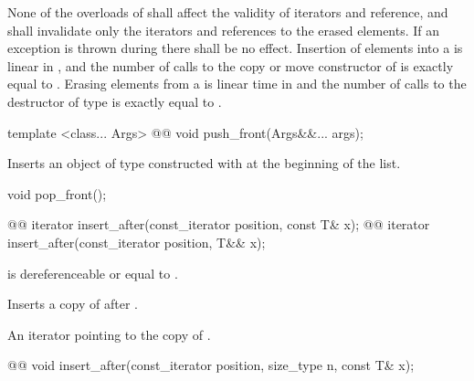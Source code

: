 \documentclass[american,twoside]{book}
\begin{document}
\pnum
None of the overloads of  shall affect the validity of iterators and reference, and  shall invalidate only the iterators and references to the erased elements. If an exception is thrown during   there shall be no effect. Insertion of  elements into a  is linear in , and the number of calls to the copy or move constructor of  is exactly equal to . Erasing  elements from a  is linear time in  and the number of calls to the destructor of type  is exactly equal to .

\begin{itemdecl}
template <class... Args> 
  @@ 
  void push_front(Args&&... args);
\end{itemdecl}

\begin{itemdescr}
\pnum
\effects Inserts an object of type  constructed with  at the beginning of the list.
\end{itemdescr}

\begin{itemdecl}
void pop_front();
\end{itemdecl}

\begin{itemdescr}
\pnum
\effects {}
\end{itemdescr}

\begin{itemdecl}
@@ 
  iterator insert_after(const_iterator position, const T& x);
@@ 
  iterator insert_after(const_iterator position, T&& x);
\end{itemdecl}

\begin{itemdescr}
\pnum
\requires {} is dereferenceable or equal to .

\pnum
\effects Inserts a copy of  after .

\pnum
\returns An iterator pointing to the copy of .
\end{itemdescr}

\begin{itemdecl}
@@ 
  void insert_after(const_iterator position, size_type n, const T& x);
\end{itemdecl}
\end{document}

